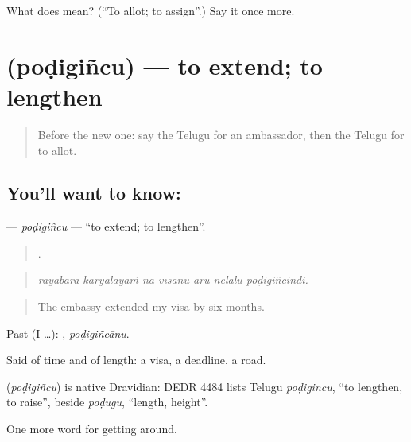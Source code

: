 \begin{tcolorbox}[breakable,colback=teal!4,colframe=teal!35!black,title={Before you move on}]
What does  mean? (\textquotedblleft{}To allot; to assign\textquotedblright{}.) Say it once more.
\end{tcolorbox}
\section[\texorpdfstring{\te{పొడిగించు} (poḍigiñcu)}{పొడిగించు (poḍigiñcu)}]{ (poḍigiñcu) — to extend; to lengthen}

\label{lesson:TE-C463-podigincu}



\begin{quote}
Before the new one: say the Telugu for an ambassador, then the Telugu for to allot.
\end{quote}

\subsection*{You'll want to know: }
\textbf{} — \emph{poḍigiñcu} — \textquotedblleft{}to extend; to lengthen\textquotedblright{}.

\begin{quote}
      .
\end{quote}

\begin{quote}
\emph{rāyabāra kāryālayaṁ nā vīsānu āru nelalu poḍigiñcindi.}
\end{quote}

\begin{quote}
The embassy extended my visa by six months.
\end{quote}

Past (I …): , \emph{poḍigiñcānu}.

Said of time and of length: a visa, a deadline, a road.

\begin{cousinweb}
\textbf{} (\emph{poḍigiñcu}) is native Dravidian: DEDR 4484 lists Telugu \emph{poḍigincu}, \textquotedblleft{}to lengthen, to raise\textquotedblright{}, beside \emph{poḍugu}, \textquotedblleft{}length, height\textquotedblright{}.
\end{cousinweb}

\begin{grammarlens}[title={What you've built}]
One more word for getting around.
\end{grammarlens}

